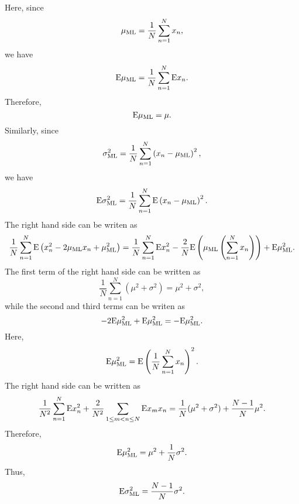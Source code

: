 Here, since 
%
\begin{equation}
\mu_{\rm ML} = \frac{1}{N} \sum_{n = 1}^{N} x_n,
\end{equation}
%
we have
%
\begin{equation}
{\rm E} \mu_{\rm ML} = \frac{1}{N} \sum_{n = 1}^{N} {\rm E} x_n.
\end{equation}
%
Therefore, 
%
\begin{equation}
{\rm E} \mu_{\rm ML} = \mu.
\end{equation}
%
Similarly, since 
%
\begin{equation}
\sigma_{\rm ML}^2 = \frac{1}{N} \sum_{n = 1}^{N} \left( x_n - \mu_{\rm ML} \right) ^ 2,
\end{equation}
%
we have 
%
\begin{equation}
{\rm E} \sigma_{\rm ML}^2 = \frac{1}{N} \sum_{n = 1}^{N} {\rm E} \left( x_n - \mu_{\rm ML} \right) ^ 2.
\end{equation}
%
The right hand side can be writen as 
%
\begin{equation}
\frac{1}{N} \sum_{n = 1}^{N} {\rm E} \left( x_n ^ 2 - 2 \mu_{\rm ML} x_n + \mu_{\rm ML} ^ 2 \right) = \frac{1}{N} \sum_{n = 1}^{N} {\rm E} x_n ^ 2 - \frac{2}{N} {\rm E} \left( \mu_{\rm ML} \left( \sum_{n = 1}^{N} x_n \right) \right) + {\rm E} \mu_{\rm ML} ^ 2.
\end{equation}
%
The first term of the right hand side can be written as 
%
\begin{equation}
\frac{1}{N} \sum_{n = 1}^{N} \left( \mu ^ 2 + \sigma ^ 2 \right) = \mu ^ 2 + \sigma ^ 2,
\end{equation}
%
while the second and third terms can be writen as
%
\begin{equation}
- 2 {\rm E} \mu_{\rm ML} ^ 2 + {\rm E} \mu_{\rm ML} ^ 2 = - {\rm E} \mu_{\rm ML} ^ 2.
\end{equation}
%
Here, 
%
\begin{equation}
{\rm E} \mu_{\rm ML} ^ 2 = {\rm E} \left( \frac{1}{N} \sum_{n = 1}^{N} x_n \right) ^ 2.
\end{equation}
%
The right hand side can be written as 
%
\begin{equation}
\frac{1}{N ^ 2} \sum_{n = 1}^{N} {\rm E} x_n ^ 2 + \frac{2}{N ^ 2} \sum_{1 \leq m < n \leq N} {\rm E} x_m x_n = \frac{1}{N} (\mu ^ 2 + \sigma ^ 2) + \frac{N - 1}{N} \mu ^ 2.
\end{equation}
%
Therefore,
%
\begin{equation}
{\rm E} \mu_{\rm ML} ^ 2 = \mu ^ 2 + \frac{1}{N} \sigma ^ 2.
\end{equation}
%
Thus,
%
\begin{equation}
{\rm E} \sigma_{\rm ML}^2 = \frac{N - 1}{N} \sigma ^ 2.
\end{equation}
%


